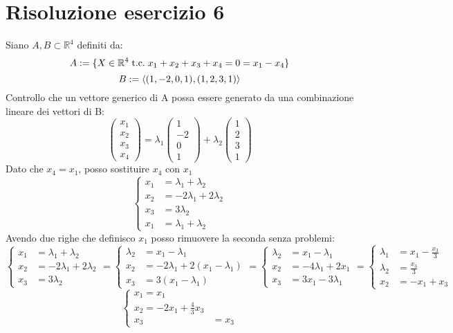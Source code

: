 \documentclass[a4paper,12pt]{article}
\begin{document}
	\section{Risoluzione esercizio 6}
	Siano $A, B \subset \mathbb{R}^4$ definiti da:
	\[A:= \{X \in \mathbb{R}^4 \;\text{t.c.}\; x_1 + x_2 + x_3 + x_4 = 0 = x_1 - x_4\}\]
	\[B:=\langle (1,-2,0,1),(1,2,3,1) \rangle\]
	Controllo che un vettore generico di A possa essere generato da una combinazione lineare dei vettori di B:
	\[\begin{pmatrix} x_1 \\ x_2 \\ x_3 \\ x_4 \end{pmatrix} = \lambda_1 \begin{pmatrix} 1 \\ -2 \\ 0 \\ 1 \end{pmatrix} + \lambda_2 \begin{pmatrix} 1 \\ 2 \\ 3 \\ 1 \end{pmatrix}\]
	Dato che $x_4 = x_1$, posso sostituire $x_4$ con $x_1$
	\[
	\left\{\begin{aligned}
		x_1 & = \lambda_1 + \lambda_2 \\
		x_2 & = -2\lambda_1 + 2\lambda_2 \\
		x_3 & = 3\lambda_2 \\
		x_1 & = \lambda_1 + \lambda_2
	\end{aligned}\right.
	\]
	Avendo due righe che definisco $x_1$ posso rimuovere la seconda senza problemi:
	\[
	\left\{\begin{aligned}
		x_1 & = \lambda_1 + \lambda_2 \\
		x_2 & = -2\lambda_1 + 2\lambda_2 \\
		x_3 & = 3\lambda_2 
	\end{aligned}\right. = 
	\left\{\begin{aligned}
	\lambda_2 & = x_1 - \lambda_1 \\
	x_2 & = -2\lambda_1 + 2(x_1 - \lambda_1) \\
	x_3 & = 3(x_1 - \lambda_1) 
	\end{aligned}\right. = 
	\left\{\begin{aligned}
	\lambda_2 & = x_1 - \lambda_1 \\
	x_2 & = -4\lambda_1 + 2x_1 \\
	x_3 & = 3x_1 - 3\lambda_1
	\end{aligned}\right. = 
	\left\{\begin{aligned}
	\lambda_1 & = x_1 - \frac{x_3}{3} \\
	\lambda_2 & = \frac{x_3}{3} \\
	x_2 & = -x_1 + x_3
	\end{aligned}\right.
	\]
	\[
	\left\{\begin{aligned}
		x_1 = x_1\\
		x_2 = -2x_1 + \frac{4}{3}x_3\\
		x_3 & = x_3
	\end{aligned}\right.
	\]
	
\end{document}
